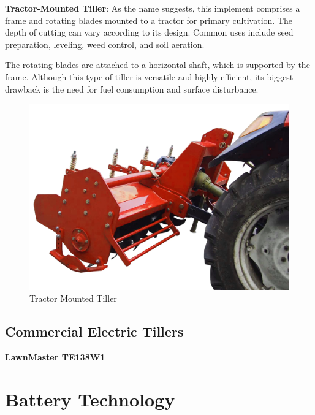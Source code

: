 \documentclass{article}
\begin{document}
\begin{flushleft}
\vspace*{3pt}

\textbf{Tractor-Mounted Tiller}: As the name suggests, this implement comprises a frame and rotating blades mounted to a tractor for primary cultivation.
 The depth of cutting can vary according to its design.
 Common uses include seed preparation, leveling, weed control, and soil aeration. \newline

The rotating blades are attached to a horizontal shaft, which is supported by the frame. \newline
Although this type of tiller is versatile and highly efficient, its biggest drawback is the need for fuel consumption and surface disturbance. \newline
\FloatBarrier
\begin{center}
    \begin{figure}[htbp!]
        \centering
    \includegraphics[scale=0.13]{cultivating_tool/Tractor-Mounted-Rotary-Tiller.jpg }
    \caption{Tractor Mounted Tiller}
    \end{figure}
    \end{center}
\FloatBarrier
\subsection*{Commercial Electric Tillers}
\textbf{LawnMaster TE138W1 }


\section*{Battery Technology}

\end{flushleft}
\end{document}
